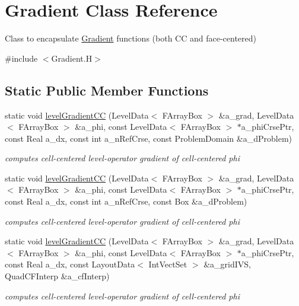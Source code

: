\hypertarget{class_gradient}{\section{Gradient Class Reference}
\label{class_gradient}
}


Class to encapsulate \hyperlink{class_gradient}{Gradient} functions (both C\-C and face-\/centered)  




{\ttfamily \#include $<$Gradient.\-H$>$}

\subsection*{Static Public Member Functions}
\begin{DoxyCompactItemize}
\item 
static void \hyperlink{class_gradient_aa657ff462b1dd44565ab4e5c35c097fa}{level\-Gradient\-C\-C} (Level\-Data$<$ F\-Array\-Box $>$ \&a\-\_\-grad, Level\-Data$<$ F\-Array\-Box $>$ \&a\-\_\-phi, const Level\-Data$<$ F\-Array\-Box $>$ $\ast$a\-\_\-phi\-Crse\-Ptr, const Real a\-\_\-dx, const int a\-\_\-n\-Ref\-Crse, const Problem\-Domain \&a\-\_\-d\-Problem)
\begin{DoxyCompactList}\small\item\em computes cell-\/centered level-\/operator gradient of cell-\/centered phi \end{DoxyCompactList}\item 
static void \hyperlink{class_gradient_a9e85cf629d0e4b0ad7809c0db1f0322c}{level\-Gradient\-C\-C} (Level\-Data$<$ F\-Array\-Box $>$ \&a\-\_\-grad, Level\-Data$<$ F\-Array\-Box $>$ \&a\-\_\-phi, const Level\-Data$<$ F\-Array\-Box $>$ $\ast$a\-\_\-phi\-Crse\-Ptr, const Real a\-\_\-dx, const int a\-\_\-n\-Ref\-Crse, const Box \&a\-\_\-d\-Problem)
\begin{DoxyCompactList}\small\item\em computes cell-\/centered level-\/operator gradient of cell-\/centered phi \end{DoxyCompactList}\item 
static void \hyperlink{class_gradient_a6a14b8f09f7882545497dcccac01e35e}{level\-Gradient\-C\-C} (Level\-Data$<$ F\-Array\-Box $>$ \&a\-\_\-grad, Level\-Data$<$ F\-Array\-Box $>$ \&a\-\_\-phi, const Level\-Data$<$ F\-Array\-Box $>$ $\ast$a\-\_\-phi\-Crse\-Ptr, const Real a\-\_\-dx, const Layout\-Data$<$ Int\-Vect\-Set $>$ \&a\-\_\-grid\-I\-V\-S, Quad\-C\-F\-Interp \&a\-\_\-cf\-Interp)
\begin{DoxyCompactList}\small\item\em computes cell-\/centered level-\/operator gradient of cell-\/centered phi \end{DoxyCompactList}\item 

\end{DoxyCompactItemize}
